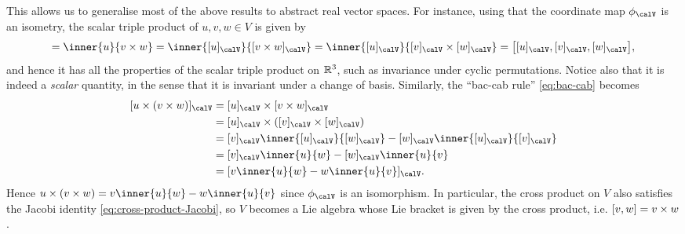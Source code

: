 This allows us to generalise most of the above results to abstract real vector spaces. For instance, using that the coordinate map $\coordmap{\calV}$ is an isometry, the scalar triple product of $u,v,w \in V$ is given by
%
\begin{equation*}
    [u,v,w]
        = \inner{u}{v \crossp w}
        = \inner{\coordvec{u}{\calV}}{\coordvec{v \crossp w}{\calV}}
        = \inner{\coordvec{u}{\calV}}{\coordvec{v}{\calV} \crossp \coordvec{w}{\calV}}
        = \bigl[ \coordvec{u}{\calV}, \coordvec{v}{\calV}, \coordvec{w}{\calV} \bigr],
\end{equation*}
%
and hence it has all the properties of the scalar triple product on $\mathbb{R}^3$, such as invariance under cyclic permutations. Notice also that it is indeed a \emph{scalar} quantity, in the sense that it is invariant under a change of basis. Similarly, the \enquote{bac-cab rule} \cref{eq:bac-cab} becomes
%
\begin{align*}
    \coordvec{u \crossp (v \crossp w)}{\calV}
        &= \coordvec{u}{\calV} \crossp \coordvec{v \crossp w}{\calV} \\
        &= \coordvec{u}{\calV} \crossp (\coordvec{v}{\calV} \crossp \coordvec{w}{\calV}) \\
        &= \coordvec{v}{\calV} \inner{\coordvec{u}{\calV}}{\coordvec{w}{\calV}} - \coordvec{w}{\calV} \inner{\coordvec{u}{\calV}}{\coordvec{v}{\calV}} \\
        &= \coordvec{v}{\calV} \inner{u}{w} - \coordvec{w}{\calV} \inner{u}{v} \\
        &= \coordvec{ v \inner{u}{w} - w \inner{u}{v} }{\calV}.
\end{align*}
%
Hence $u \crossp (v \crossp w) = v \inner{u}{w} - w \inner{u}{v}$ since $\coordmap{\calV}$ is an isomorphism. In particular, the cross product on $V$ also satisfies the Jacobi identity \cref{eq:cross-product-Jacobi}, so $V$ becomes a Lie algebra whose Lie bracket is given by the cross product, i.e. $[v,w] = v \times w$.